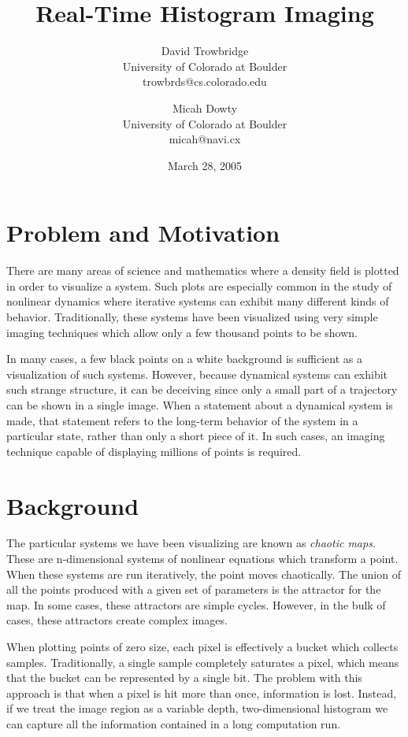 \documentclass[letterpaper, 11pt]{article}
\title{Real-Time Histogram Imaging}
\author{
	David Trowbridge \\ University of Colorado at Boulder \\ trowbrds@cs.colorado.edu
\and
	Micah Dowty \\ University of Colorado at Boulder \\ micah@navi.cx
}
\date{March 28, 2005}
\begin{document}
\maketitle

\section{Problem and Motivation}
There are many areas of science and mathematics where a density field is plotted in order
to visualize a system.  Such plots are especially common in the study of nonlinear dynamics
where iterative systems can exhibit many different kinds of behavior.  Traditionally, these
systems have been visualized using very simple imaging techniques which allow only a few
thousand points to be shown.

In many cases, a few black points on a white background is sufficient as a visualization
of such systems.  However, because dynamical systems can exhibit such strange structure,
it can be deceiving since only a small part of a trajectory can be shown in a single image.
When a statement about a dynamical system is made, that statement refers to the long-term
behavior of the system in a particular state, rather than only a short piece of it.  In such
cases, an imaging technique capable of displaying millions of points is required.

\section{Background}
The particular systems we have been visualizing are known as \emph{chaotic maps}.  These are
n-dimensional systems of nonlinear equations which transform a point.  When these systems are
run iteratively, the point moves chaotically.  The union of all the points produced with a given
set of parameters is the attractor for the map.  In some cases, these attractors are simple
cycles.  However, in the bulk of cases, these attractors create complex images.

When plotting points of zero size, each pixel is effectively a bucket which collects samples.
Traditionally, a single sample completely saturates a pixel, which means that the bucket
can be represented by a single bit.  The problem with this approach is that when a pixel is
hit more than once, information is lost.  Instead, if we treat the image region as a variable
depth, two-dimensional histogram we can capture all the information contained in a long
computation run.
\end{document}

